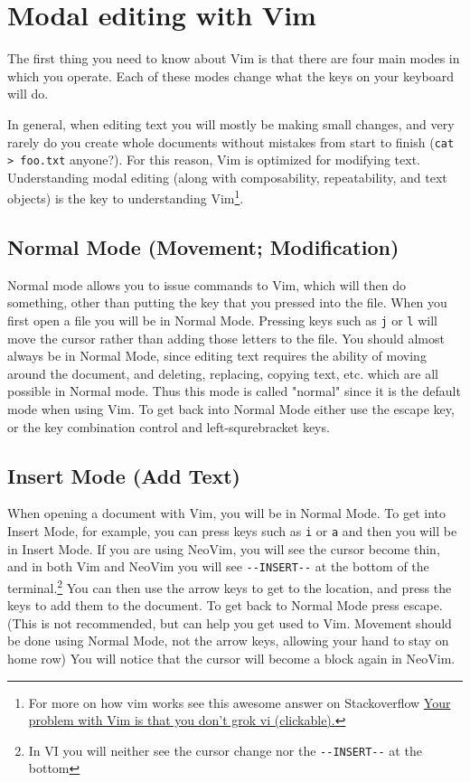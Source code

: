 \documentclass[11pt]{article}
\begin{document}
\newpage

\section{Modal editing with Vim}
\label{sec:org5798bc4}
The first thing you need to know about Vim is that there are four main modes in
which you operate. Each of these modes change what the keys on your keyboard
will do.

In general, when editing text you will mostly be making small changes, and very
rarely do you create whole documents without mistakes from start to finish (\texttt{cat
> foo.txt} anyone?). For this reason, Vim is optimized for modifying text.
Understanding modal editing (along with composability, repeatability, and text
objects) is the key to understanding Vim\footnote{For more on how vim works see this awesome answer on Stackoverflow
\href{https://stackoverflow.com/questions/1218390/what-is-your-most-productive-shortcut-with-vim}{Your problem with Vim is that you don't grok vi (clickable).}}.
\subsection{Normal Mode (Movement; Modification)}
\label{sec:orgbd8eb16}
Normal mode allows you to issue commands to Vim, which will then do something,
other than putting the key that you pressed into the file. When you first open a
file you will be in Normal Mode. Pressing keys such as \texttt{j} or \texttt{l} will move the
cursor rather than adding those letters to the file. You should almost always be
in Normal Mode, since editing text requires the ability of moving around the
document, and deleting, replacing, copying text, etc. which are all possible in
Normal mode. Thus this mode is called "normal" since it is the default mode when
using Vim. To get back into Normal Mode either use the escape key, or the key 
combination control and left-squrebracket keys.
\subsection{Insert Mode (Add Text)}
\label{sec:orgdfca803}
When opening a document with Vim, you will be in Normal Mode. To get into Insert
Mode, for example, you can press keys such as \texttt{i} or \texttt{a} and then you will be in
Insert Mode. If you are using NeoVim, you will see the cursor become thin, and
in both Vim and NeoVim you will see \texttt{-{}-INSERT-{}-} at the bottom of the
terminal.\footnote{In VI you will neither see the cursor change nor the \texttt{-{}-INSERT-{}-} at the bottom} You can then use the arrow keys to get to the location, and
press the keys to add them to the document. To get back to Normal Mode press
escape. (This is not recommended, but can help you get used to Vim. Movement
should be done using Normal Mode, not the arrow keys, allowing your hand to stay
on home row) You will notice that the cursor will become a block again in
NeoVim.
\end{document}
